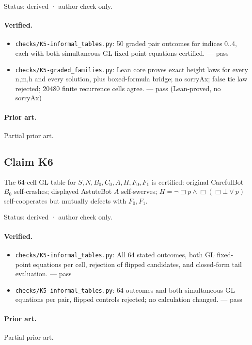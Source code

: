 \documentclass{article}
\begin{document}
Status: derived · author check only.

\paragraph{Verified.}
\begin{itemize}
\item \texttt{checks/K5-informal\_tables.py}: 50 graded pair outcomes for indices 0..4, each with both simultaneous GL fixed-point equations certified. --- pass
\item \texttt{checks/K5-graded\_families.py}: Lean core proves exact height laws for every n,m,h and every solution, plus boxed-formula bridge; no sorryAx; false tie law rejected; 20480 finite recurrence cells agree. --- pass (Lean-proved, no sorryAx)
\end{itemize}

\paragraph{Prior art.} Partial prior art.

\subsection*{Claim K6}

The 64-cell GL table for $S,N,B_0,C_0,A,H,F_0,F_1$ is certified: original CarefulBot $B_0$ self-crashes; displayed AstuteBot $A$ self-swerves; $H=\neg\Box p\land\Box(\Box\bot\lor p)$ self-cooperates but mutually defects with $F_0,F_1$.

Status: derived · author check only.

\paragraph{Verified.}
\begin{itemize}
\item \texttt{checks/K5-informal\_tables.py}: All 64 stated outcomes, both GL fixed-point equations per cell, rejection of flipped candidates, and closed-form tail evaluation. --- pass
\item \texttt{checks/K5-informal\_tables.py}: 64 outcomes and both simultaneous GL equations per pair, flipped controls rejected; no calculation changed. --- pass
\end{itemize}

\paragraph{Prior art.} Partial prior art.
\end{document}
